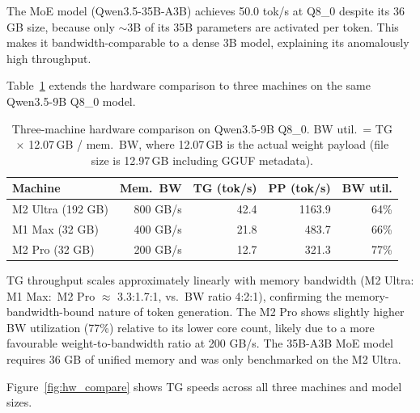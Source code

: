\documentclass[11pt,a4paper]{article}
\begin{document}
The MoE model (Qwen3.5-35B-A3B) achieves 50.0 tok/s at Q8\_0 despite its 36 GB
size, because only $\sim$3B of its 35B parameters are activated per token.
This makes it bandwidth-comparable to a dense 3B model, explaining its
anomalously high throughput.

Table~\ref{tab:hw_compare} extends the hardware comparison to three machines on
the same Qwen3.5-9B Q8\_0 model.

\begin{table}[h]
\centering
\caption{Three-machine hardware comparison on Qwen3.5-9B Q8\_0.
BW util.\ = TG $\times$ 12.07\,GB / mem.\ BW, where 12.07\,GB is the
actual weight payload (file size is 12.97\,GB including GGUF metadata).}
\label{tab:hw_compare}
\begin{tabular}{lrrrr}
\toprule
\textbf{Machine} & \textbf{Mem.\ BW} & \textbf{TG (tok/s)} & \textbf{PP (tok/s)} & \textbf{BW util.} \\
\midrule
M2 Ultra (192 GB) & 800 GB/s & 42.4 & 1163.9 & 64\% \\
M1 Max (32 GB)    & 400 GB/s & 21.8 &  483.7 & 66\% \\
M2 Pro (32 GB)    & 200 GB/s & 12.7 &  321.3 & 77\% \\
\bottomrule
\end{tabular}
\end{table}

TG throughput scales approximately linearly with memory bandwidth (M2 Ultra:
M1 Max:\ M2 Pro $\approx$ 3.3:1.7:1, vs.\ BW ratio 4:2:1), confirming
the memory-bandwidth-bound nature of token generation.
The M2 Pro shows slightly higher BW utilization (77\%) relative to its lower core
count, likely due to a more favourable weight-to-bandwidth ratio at 200 GB/s.
The 35B-A3B MoE model requires 36 GB of unified memory and was only benchmarked
on the M2 Ultra.

Figure~\ref{fig:hw_compare} shows TG speeds across all three machines and model
sizes.
\end{document}
